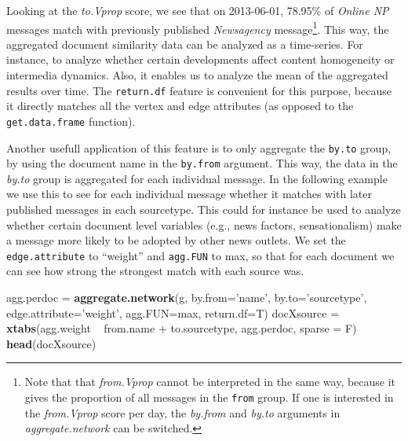 \documentclass[]{article}
\newenvironment{Shaded}{\begin{snugshade}}{\end{snugshade}}
\newcommand{\KeywordTok}[1]{\textcolor[rgb]{0.13,0.29,0.53}{\textbf{{#1}}}}
\newcommand{\DataTypeTok}[1]{\textcolor[rgb]{0.13,0.29,0.53}{{#1}}}
\newcommand{\StringTok}[1]{\textcolor[rgb]{0.31,0.60,0.02}{{#1}}}
\newcommand{\NormalTok}[1]{{#1}}
\let\rmarkdownfootnote\footnote%
\def\footnote{\protect\rmarkdownfootnote}
\begin{document}
Looking at the \emph{to.Vprop} score, we see that on 2013-06-01, 78.95\%
of \emph{Online NP} messages match with previously published
\emph{Newsagency} message\footnote{Note that that \emph{from.Vprop}
  cannot be interpreted in the same way, because it gives the proportion
  of all messages in the \texttt{from} group. If one is interested in
  the \emph{from.Vprop} score per day, the \emph{by.from} and
  \emph{by.to} arguments in \emph{aggregate.network} can be switched.}.
This way, the aggregated document similarity data can be analyzed as a
time-series. For instance, to analyze whether certain developments
affect content homogeneity or intermedia dynamics. Also, it enables us
to analyze the mean of the aggregated results over time. The
\texttt{return.df} feature is convenient for this purpose, because it
directly matches all the vertex and edge attributes (as opposed to the
\texttt{get.data.frame} function).

Another usefull application of this feature is to only aggregate the
\texttt{by.to} group, by using the document name in the \texttt{by.from}
argument. This way, the data in the \emph{by.to} group is aggregated for
each individual message. In the following example we use this to see for
each individual message whether it matches with later published messages
in each sourcetype. This could for instance be used to analyze whether
certain document level variables (e.g., news factors, sensationalism)
make a message more likely to be adopted by other news outlets. We set
the \texttt{edge.attribute} to ``weight'' and \texttt{agg.FUN} to max,
so that for each document we can see how strong the strongest match with
each source was.

\begin{Shaded}
\begin{Highlighting}[]
\NormalTok{agg.perdoc =}\StringTok{ }\KeywordTok{aggregate.network}\NormalTok{(g, }\DataTypeTok{by.from=}\StringTok{'name'}\NormalTok{, }\DataTypeTok{by.to=}\StringTok{'sourcetype'}\NormalTok{, }
                                  \DataTypeTok{edge.attribute=}\StringTok{'weight'}\NormalTok{, }\DataTypeTok{agg.FUN=}\NormalTok{max, }
                                  \DataTypeTok{return.df=}\NormalTok{T)}
\NormalTok{docXsource =}\StringTok{ }\KeywordTok{xtabs}\NormalTok{(agg.weight ~}\StringTok{ }\NormalTok{from.name +}\StringTok{ }\NormalTok{to.sourcetype, agg.perdoc, }\DataTypeTok{sparse =} \NormalTok{F)}
\KeywordTok{head}\NormalTok{(docXsource)}
\end{Highlighting}
\end{Shaded}
\end{document}
